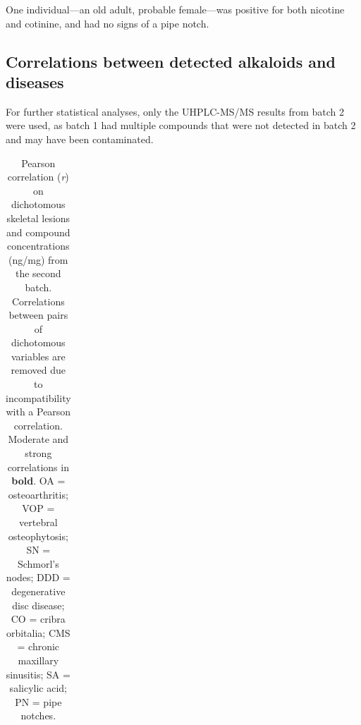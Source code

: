 \documentclass[
  b5paper,
]{book}
\begin{document}
One individual---an old adult, probable female---was positive for both
nicotine and cotinine, and had no signs of a pipe notch.

\subsection{Correlations between detected alkaloids and
diseases}\label{correlations-between-detected-alkaloids-and-diseases}

For further statistical analyses, only the UHPLC-MS/MS results from
batch 2 were used, as batch 1 had multiple compounds that were not
detected in batch 2 and may have been contaminated.

\begin{longtable}[]{@{}
  >{\raggedright\arraybackslash}p{}
  >{\raggedright\arraybackslash}p{}
  >{\raggedright\arraybackslash}p{}
  >{\raggedright\arraybackslash}p{}
  >{\raggedright\arraybackslash}p{}
  >{\raggedright\arraybackslash}p{}
  >{\raggedright\arraybackslash}p{}
  >{\raggedright\arraybackslash}p{}
  >{\raggedright\arraybackslash}p{}@{}}

\caption{\label{tbl-pearson}Pearson correlation (\emph{r}) on
dichotomous skeletal lesions and compound concentrations (ng/mg) from
the second batch. Correlations between pairs of dichotomous variables
are removed due to incompatibility with a Pearson correlation. Moderate
and strong correlations in \textbf{bold}. OA = osteoarthritis; VOP =
vertebral osteophytosis; SN = Schmorl's nodes; DDD = degenerative disc
disease; CO = cribra orbitalia; CMS = chronic maxillary sinusitis; SA =
salicylic acid; PN = pipe notches.}

\tabularnewline


\end{longtable}
\end{document}
